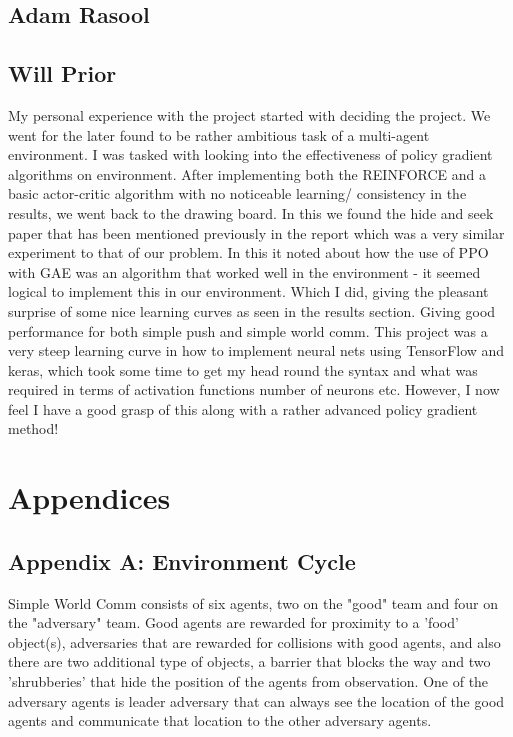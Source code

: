 \documentclass{article}
\begin{document}
\subsection{Adam Rasool}

\subsection{Will Prior}

My personal experience with the project started with deciding the project.
We went for the later found to be rather ambitious task of a multi-agent environment.
I was tasked with looking into the effectiveness of policy gradient algorithms on environment.
After implementing both the REINFORCE and a basic actor-critic algorithm with no noticeable learning/ consistency in the results, we went back to the drawing board.
In this we found the hide and seek paper that has been mentioned previously in the report which was a very similar experiment to that of our problem.
In this it noted about how the use of PPO with GAE was an algorithm that worked well in the environment - it seemed logical to implement this in our environment.
Which I did, giving the pleasant surprise of some nice learning curves as seen in the results section.
Giving good performance for both simple push and simple world comm.
This project was a very steep learning curve in how to implement neural nets using TensorFlow and keras, which took some time to get my head round the syntax and what was required in terms of activation functions number of neurons etc.
However, I now feel I have a good grasp of this along with a rather advanced policy gradient method!




\small

\normalsize
\newpage

\section*{Appendices}
\subsection*{Appendix A: Environment Cycle}

Simple World Comm consists of six agents, two on the "good" team and four on the "adversary" team.
Good agents are rewarded for proximity to a 'food' object(s), adversaries that are rewarded for collisions with good agents, and also there are two additional type of objects, a barrier that blocks the way and two 'shrubberies' that hide the position of the agents from observation.
One of the adversary agents is leader adversary that can always see the location of the good agents and communicate that location to the other adversary agents.
\end{document}
